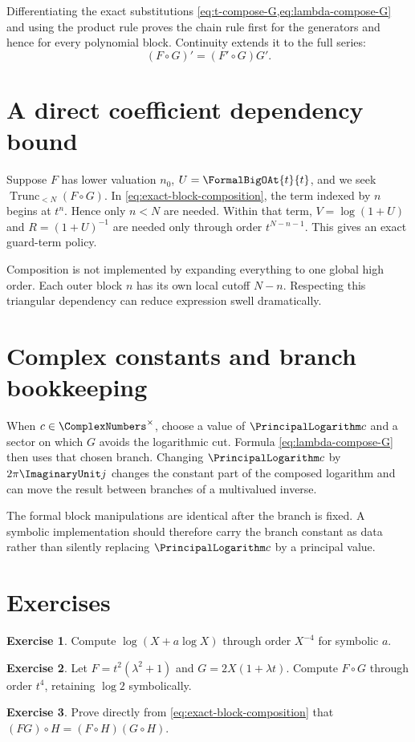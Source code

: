 \documentclass[11pt,openany]{book}
\theoremstyle{definition}
\newtheorem{exercise}{Exercise}[chapter]
\theoremstyle{plain}
\theoremstyle{remark}
\DeclareMathOperator{\trunc}{Trunc}
\begin{document}
Differentiating the exact substitutions \cref{eq:t-compose-G,eq:lambda-compose-G} and using the product rule proves the chain rule first for the generators and hence for every polynomial block. Continuity extends it to the full series:
\begin{equation}\label{eq:chain-rule}
 (F\circ G)'=(F'\circ G)G'.
\end{equation}

\section{A direct coefficient dependency bound}
Suppose \(F\) has lower valuation \(n_0\), \(U=\FormalBigOAt{t}{t}\), and we seek \(\trunc_{<N}(F\circ G)\). In \cref{eq:exact-block-composition}, the term indexed by \(n\) begins at \(t^n\). Hence only \(n<N\) are needed. Within that term, \(V=\log(1+U)\) and \(R=(1+U)^{-1}\) are needed only through order \(t^{N-n-1}\). This gives an exact guard-term policy.

\begin{algorithmicbox}
Composition is not implemented by expanding everything to one global high order. Each outer block \(n\) has its own local cutoff \(N-n\). Respecting this triangular dependency can reduce expression swell dramatically.
\end{algorithmicbox}

\section{Complex constants and branch bookkeeping}
When \(c\in\ComplexNumbers^\times\), choose a value of \(\PrincipalLogarithm c\) and a sector on which \(G\) avoids the logarithmic cut. Formula \cref{eq:lambda-compose-G} then uses that chosen branch. Changing \(\PrincipalLogarithm c\) by \(2\pi\ImaginaryUnit j\) changes the constant part of the composed logarithm and can move the result between branches of a multivalued inverse.

The formal block manipulations are identical after the branch is fixed. A symbolic implementation should therefore carry the branch constant as data rather than silently replacing \(\PrincipalLogarithm c\) by a principal value.

\section{Exercises}
\begin{exercise}
Compute \(\log(X+a\log X)\) through order \(X^{-4}\) for symbolic \(a\).
\end{exercise}
\begin{exercise}
Let \(F=t^2(\lambda^2+1)\) and \(G=2X(1+\lambda t)\). Compute \(F\circ G\) through order \(t^4\), retaining \(\log2\) symbolically.
\end{exercise}
\begin{exercise}
Prove directly from \cref{eq:exact-block-composition} that \((FG)\circ H=(F\circ H)(G\circ H)\).
\end{exercise}
\end{document}
